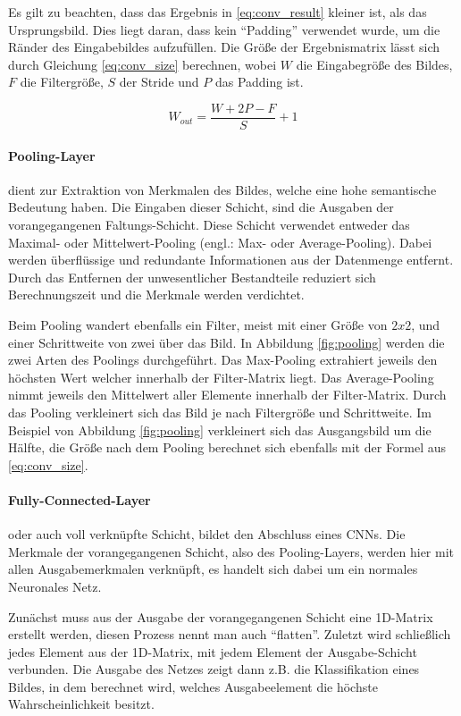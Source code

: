 Es gilt zu beachten, dass das Ergebnis in \ref{eq:conv_result} kleiner ist, als das Ursprungsbild. Dies liegt daran, dass kein ``Padding'' verwendet wurde, um die Ränder des Eingabebildes aufzufüllen. Die Größe der Ergebnismatrix lässt sich durch Gleichung \ref{eq:conv_size} berechnen, wobei $W$ die Eingabegröße des Bildes, $F$ die Filtergröße, $S$ der Stride und $P$ das Padding ist. \cite[vgl.][]{Teoh2023}

\begin{equation}
	W_{out}= \dfrac{W+2P-F}{S}+1
	\label{eq:conv_size}
\end{equation}

\paragraph{Pooling-Layer} dient zur Extraktion von Merkmalen des Bildes, welche eine hohe semantische Bedeutung haben. Die Eingaben dieser Schicht, sind die Ausgaben der vorangegangenen Faltungs-Schicht. Diese Schicht verwendet entweder das Maximal- oder Mittelwert-Pooling (engl.: Max- oder Average-Pooling). Dabei werden überflüssige und redundante Informationen aus der Datenmenge entfernt. Durch das Entfernen der unwesentlicher Bestandteile reduziert sich Berechnungszeit und die Merkmale werden verdichtet. 

Beim Pooling wandert ebenfalls ein Filter, meist mit einer Größe von $2x2$, und einer Schrittweite von zwei über das Bild. In Abbildung \ref{fig:pooling} werden die zwei Arten des Poolings durchgeführt. Das Max-Pooling extrahiert jeweils den höchsten Wert welcher innerhalb der Filter-Matrix liegt. Das Average-Pooling nimmt jeweils den Mittelwert aller Elemente innerhalb der Filter-Matrix. Durch das Pooling verkleinert sich das Bild je nach Filtergröße und Schrittweite.\cite[vgl.][]{Teoh2023} Im Beispiel von Abbildung \ref{fig:pooling} verkleinert sich das Ausgangsbild um die Hälfte, die Größe nach dem Pooling berechnet sich ebenfalls mit der Formel aus \ref{eq:conv_size}.

\paragraph{Fully-Connected-Layer} oder auch voll verknüpfte Schicht, bildet den Abschluss eines \ac{CNN}s. Die Merkmale der vorangegangenen Schicht, also des Pooling-Layers, werden hier mit allen Ausgabemerkmalen verknüpft, es handelt sich dabei um ein normales Neuronales Netz. 

Zunächst muss aus der Ausgabe der vorangegangenen Schicht eine 1D-Matrix erstellt werden, diesen Prozess nennt man auch ``flatten''. Zuletzt wird schließlich jedes Element aus der 1D-Matrix, mit jedem Element der Ausgabe-Schicht verbunden. Die Ausgabe des Netzes zeigt dann z.B. die Klassifikation eines Bildes, in dem berechnet wird, welches Ausgabeelement die höchste Wahrscheinlichkeit besitzt. \cite[vgl.][]{Weidman2020}

